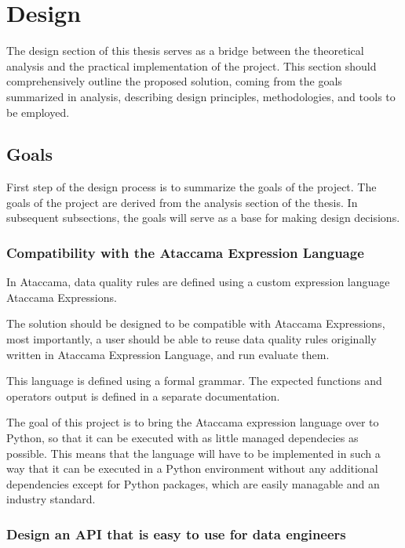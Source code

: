 
\chapter{Design}

The design section of this thesis serves as a bridge between the theoretical analysis and the practical implementation of the project. This section should comprehensively outline the proposed solution, coming from the goals summarized in analysis, describing design principles, methodologies, and tools to be employed. 

\section{Goals}

First step of the design process is to summarize the goals of the project. The goals of the project are derived from the analysis section of the thesis. In subsequent subsections, the goals will serve as a base for making design decisions. 


\subsection{Compatibility with the Ataccama Expression Language}

In Ataccama, data quality rules are defined using a custom expression language Ataccama Expressions. 

The solution should be designed to be compatible with Ataccama Expressions, most importantly, a user should be able to reuse data quality rules originally written in Ataccama Expression Language, and run evaluate them.

This language is defined using a formal grammar. The expected functions and operators output is defined in a separate documentation.

The goal of this project is to bring the Ataccama expression language over to Python, so that it can be executed with as little managed dependecies as possible. This means that the language will have to be implemented in such a way that it can be executed in a Python environment without any additional dependencies except for Python packages, which are easily managable and an industry standard.


\subsection{Design an API that is easy to use for data engineers}

